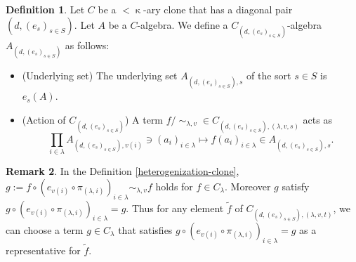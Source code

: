 \documentclass[a4paper,10pt]{article}
\theoremstyle{definition}
\newtheorem{df}{Definition}[section]
\newtheorem{rem}[df]{Remark}
\newcommand\mc{\mathclose}
\begin{document}
\begin{df}
Let $C$ be a $<\mc\kappa$-ary clone that has a diagonal pair $(d,(e_s)_{s\in S})$.
Let $A$ be a $C$-algebra.
We define a $C_{(d,(e_s)_{s\in S})}$-algebra $A_{(d,(e_s)_{s\in S})}$ as follows:
\begin{itemize}
\item (Underlying set)
The underlying set $A_{(d,(e_s)_{s\in S}),s}$ of the sort $s\in S$ is $e_s(A)$.
\item (Action of $C_{(d,(e_s)_{s\in S})}$)
A term $f/\mc\sim_{\lambda,v}\in C_{(d,(e_s)_{s\in S}),(\lambda,v,s)}$ acts as
\[
\prod_{i\in\lambda} A_{(d,(e_s)_{s\in S}),v(i)}\ni(a_i)_{i\in\lambda}
\mapsto f(a_i)_{i\in\lambda}\in A_{(d,(e_s)_{s\in S}),s}.
\]
\end{itemize}
\end{df}

\begin{rem}\label{hetero-representative}
In the Definition \ref{heterogenization-clone},
$g:=f\circ (e_{v(i)}\circ \pi_{(\lambda,i)})_{i\in\lambda}\sim_{\lambda,v} f$
holds for $f\in C_\lambda$. Moreover $g$ satisfy
$g\circ (e_{v(i)}\circ \pi_{(\lambda,i)})_{i\in\lambda}=g$.
Thus for any element $\tilde{f}$ of $C_{(d,(e_s)_{s\in S}),(\lambda,v,t)}$,
we can choose a term $g\in C_\lambda$ that satisfies
$g\circ (e_{v(i)}\circ \pi_{(\lambda,i)})_{i\in\lambda}=g$
as a representative for $\tilde{f}$.
\end{rem}
\end{document}
